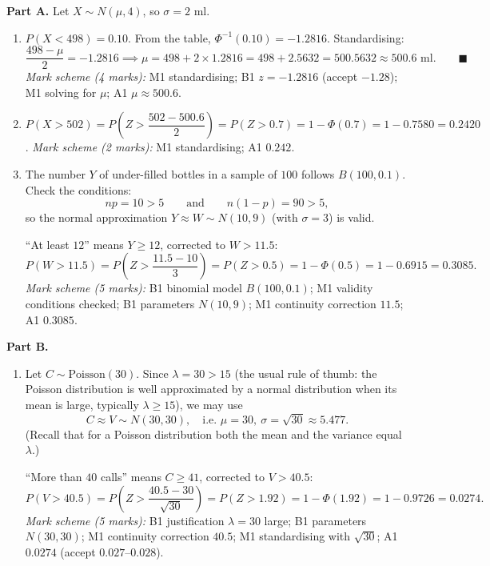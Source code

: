 \documentclass[11pt]{article}
\begin{document}
\begin{corrige}
\textbf{Part A.} Let $X \sim N(\mu, 4)$, so $\sigma = 2$ ml.

\begin{enumerate}
\item $P(X < 498) = 0.10$. From the table, $\Phi^{-1}(0.10) = -1.2816$. Standardising:
\[
\frac{498 - \mu}{2} = -1.2816 \implies \mu = 498 + 2 \times 1.2816 = 498 + 2.5632 = 500.5632 \approx 500.6 \text{ ml}. \qquad \blacksquare
\]
\emph{Mark scheme (4 marks):} M1 standardising; B1 $z = -1.2816$ (accept $-1.28$); M1 solving for $\mu$; A1 $\mu \approx 500.6$.

\item $P(X > 502) = P\!\left(Z > \dfrac{502 - 500.6}{2}\right) = P(Z > 0.7) = 1 - \Phi(0.7) = 1 - 0.7580 = \boxed{0.2420}$.
\emph{Mark scheme (2 marks):} M1 standardising; A1 $0.242$.

\item The number $Y$ of under-filled bottles in a sample of $100$ follows $B(100, 0.1)$. Check the conditions:
\[
np = 10 > 5 \qquad \text{and} \qquad n(1-p) = 90 > 5,
\]
so the normal approximation $Y \approx W \sim N(10, 9)$ (with $\sigma = 3$) is valid.

``At least $12$'' means $Y \ge 12$, corrected to $W > 11.5$:
\[
P(W > 11.5) = P\!\left(Z > \frac{11.5 - 10}{3}\right) = P(Z > 0.5) = 1 - \Phi(0.5) = 1 - 0.6915 = \boxed{0.3085}.
\]
\emph{Mark scheme (5 marks):} B1 binomial model $B(100, 0.1)$; M1 validity conditions checked; B1 parameters $N(10, 9)$; M1 continuity correction $11.5$; A1 $0.3085$.
\end{enumerate}

\textbf{Part B.}
\begin{enumerate}
\item[(d)] Let $C \sim \mathrm{Poisson}(30)$. Since $\lambda = 30 > 15$ (the usual rule of thumb: the Poisson distribution is well approximated by a normal distribution when its mean is large, typically $\lambda \ge 15$), we may use
\[
C \approx V \sim N(30, 30), \quad \text{i.e. } \mu = 30,\ \sigma = \sqrt{30} \approx 5.477.
\]
(Recall that for a Poisson distribution both the mean and the variance equal $\lambda$.)

``More than $40$ calls'' means $C \ge 41$, corrected to $V > 40.5$:
\[
P(V > 40.5) = P\!\left(Z > \frac{40.5 - 30}{\sqrt{30}}\right) = P(Z > 1.92) = 1 - \Phi(1.92) = 1 - 0.9726 = \boxed{0.0274}.
\]
\emph{Mark scheme (5 marks):} B1 justification $\lambda = 30$ large; B1 parameters $N(30, 30)$; M1 continuity correction $40.5$; M1 standardising with $\sqrt{30}$; A1 $0.0274$ (accept $0.027$–$0.028$).
\end{enumerate}
\end{corrige}
\end{document}
